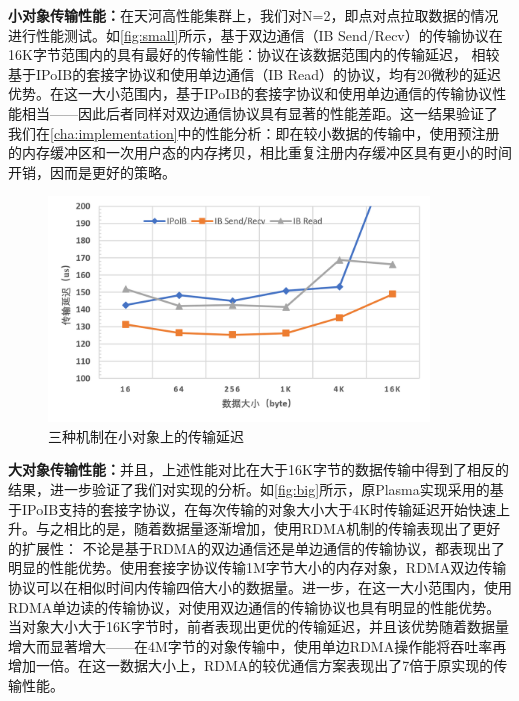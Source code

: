 \textbf{小对象传输性能：}在天河高性能集群上，我们对N=2，即点对点拉取数据的情况进行性能测试。如\autoref{fig:small}所示，基于双边通信（IB Send/Recv）的传输协议在16K字节范围内的具有最好的传输性能：协议在该数据范围内的传输延迟，
相较基于IPoIB的套接字协议和使用单边通信（IB Read）的协议，均有20微秒的延迟优势。在这一大小范围内，基于IPoIB的套接字协议和使用单边通信的传输协议性能相当——因此后者同样对双边通信协议具有显著的性能差距。这一结果验证了
我们在\autoref{cha:implementation}中的性能分析：即在较小数据的传输中，使用预注册的内存缓冲区和一次用户态的内存拷贝，相比重复注册内存缓冲区具有更小的时间开销，因而是更好的策略。

\begin{figure}[h]
	\centering
	\includegraphics[width=0.9\textwidth]{image/chap04/small.png}
	\caption{三种机制在小对象上的传输延迟}
	\label{fig:small}
\end{figure}

\textbf{大对象传输性能：}并且，上述性能对比在大于16K字节的数据传输中得到了相反的结果，进一步验证了我们对实现的分析。如\autoref{fig:big}所示，原Plasma实现采用的基于IPoIB支持的套接字协议，在每次传输的对象大小大于4K时传输延迟开始快速上升。与之相比的是，随着数据量逐渐增加，使用RDMA机制的传输表现出了更好的扩展性：
不论是基于RDMA的双边通信还是单边通信的传输协议，都表现出了明显的性能优势。使用套接字协议传输1M字节大小的内存对象，RDMA双边传输协议可以在相似时间内传输四倍大小的数据量。进一步，在这一大小范围内，使用RDMA单边读的传输协议，对使用双边通信的传输协议也具有明显的性能优势。
当对象大小大于16K字节时，前者表现出更优的传输延迟，并且该优势随着数据量增大而显著增大——在4M字节的对象传输中，使用单边RDMA操作能将吞吐率再增加一倍。在这一数据大小上，RDMA的较优通信方案表现出了7倍于原实现的传输性能。

